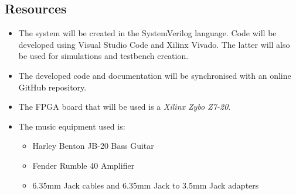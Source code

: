 \subsection*{Resources}
\begin{itemize}
    \item The system will be created in the SystemVerilog language. Code will be developed using Visual Studio Code and Xilinx Vivado. The latter will also be used for simulations and testbench creation.
    \item The developed code and documentation will be synchronised with an online GitHub repository.
    \item The FPGA board that will be used is a \textit{Xilinx Zybo Z7-20}.
    \item The music equipment used is:
    \begin{itemize}
        \item Harley Benton JB-20 Bass Guitar
        \item Fender Rumble 40 Amplifier
        \item 6.35mm Jack cables and 6.35mm Jack to 3.5mm Jack adapters 
    \end{itemize}
\end{itemize}


